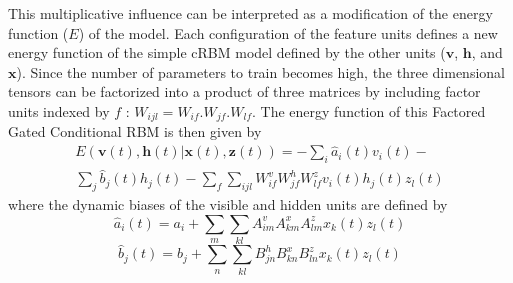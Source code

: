 \documentclass[letterpaper]{article}
\begin{document}
This multiplicative influence can be interpreted as a modification of the energy function ($E$) of the model. Each configuration of the feature units defines a new energy function of the simple cRBM model defined by the other units ($\bm{v}$, $\bm{h}$, and $\bm{x}$). Since the number of parameters to train becomes high, the three dimensional tensors can be factorized into a product of three matrices by including factor units indexed by $f$ : $W_{ijl} = W_{if} . W_{jf} . W_{lf}$.
The energy function of this Factored Gated Conditional RBM is then given by
\begin{equation}
\begin{split}
E(\bm{v}(t),\bm{h}(t)|\bm{x}(t),\bm{z}(t)) = - \sum_{i} \hat{a}_{i}(t)v_{i}(t) - \\ \sum_{j} \hat{b}_{j}(t)h_{j}(t)
-\sum_{f}\sum_{ijl} W_{if}^{v} W_{jf}^{h} W_{lf}^{z} v_{i}(t) h_{j}(t) z_{l}(t) 
\end{split}
\end{equation}
where the dynamic biases of the visible and hidden units are defined by
\begin{equation}
\hat{a}_{i}(t) = a_{i} + \sum_{m} \sum_{kl}A_{im}^{v}A_{km}^{x}A_{lm}^{z}x_{k}(t)z_{l}(t)
\end{equation}
\begin{equation}
\hat{b}_{j}(t) = b_{j} + \sum_{n} \sum_{kl}B_{jn}^{h}B_{kn}^{x}B_{ln}^{z}x_{k}(t)z_{l}(t)
\end{equation}
%
\end{document}

